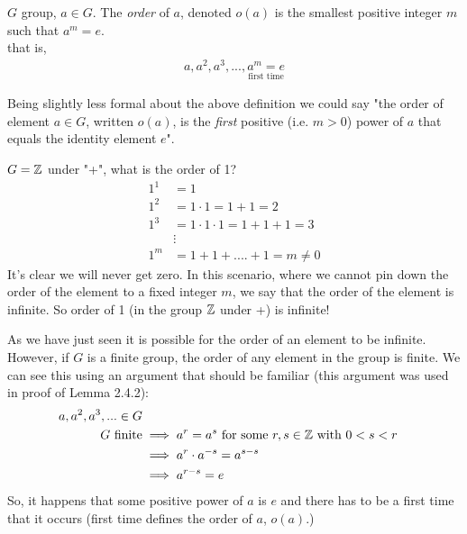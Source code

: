 \begin{definition}
$G$ group, $a\in G$. The \textit{order} of $a$, denoted $o(a)$ is the smallest positive integer $m$ such that $a^m=e$.\steezybreak\\ that is,
\begin{align}
    a,a^2,a^3, ..., \underset{\text{first time}}{a^m=e}\nonumber
\end{align}
\end{definition}
Being slightly less formal about the above definition we could say "the order of element $a\in G$, written $o(a)$, is the \textit{first} positive (i.e. $m>0$) power of $a$ that equals the identity element $e$".
\begin{example}
$G={\mathbb{ Z}}$ under "+", what is the order of 1?
\begin{align}
    1^1&=1\nonumber\\
    1^2&=1\cdot 1= 1+1=2\nonumber\\
    1^3&=1\cdot 1\cdot 1=1+1+1=3\nonumber\\
    &\vdots \nonumber \\
    1^m&=1+1+....+1=m \neq 0\nonumber
\end{align}
It's clear we will never get zero. In this scenario, where we cannot pin down the order of the element to a fixed integer $m$, we say that the order of the element is infinite. So order of 1 (in the group ${\mathbb{ Z}}$ under +) is infinite!
\end{example}
As we have just seen it is possible for the order of an element to be infinite. However, if $G$ is a finite group, the order of any element in the group is finite. We can see this using an argument that should be familiar (this argument was used in proof of Lemma 2.4.2):
\begin{align}
    a,a^2,a^3,... \in G \nonumber\\
    G \text{ finite} &\implies a^r=a^s \text{ for some }r,s\in {\mathbb{ Z}} \text{ with }0<s<r \nonumber \\
    &\implies a^r\cdot a^{-s}=a^{s-s} \nonumber \\
    &\implies a^{r-s}=e \nonumber
\end{align}
So, it happens that some positive power of $a$ is $e$ and there has to be a first time that it occurs (first time defines the order of $a$, $o(a)$.)
